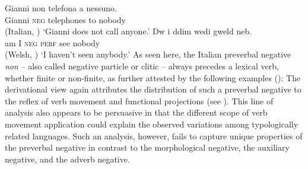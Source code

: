 \documentclass[output=paper
	        ,collection
	        ,collectionchapter
 	        ,biblatex
                ,babelshorthands
                ,newtxmath
                ,draftmode
                ,colorlinks, citecolor=brown
]{langscibook}
\begin{document}
{\begin{exe}
\begin{xlist}
\eal
\ex \label{negation-position-1a}
\gll Gianni non telefona a nessuno.\\
     Gianni \textsc{neg} telephones to nobody\\ \hfill (Italian, \citealt[]{Borsley:06})
\glt`Gianni does not call anyone.'
\ex \label{negation-position-1c}
\gll Dw i ddim wedi gweld neb.\\
     am I \textsc{neg} \textsc{perf} see nobody\\ \hfill  (Welsh, \citealt[]{Borsley:05})
\glt `I haven't seen anybody.'
\zl
%
%
As seen here, 
the Italian preverbal negative \textit{non} -- also called negative particle or
clitic -- always precedes a lexical  verb, whether finite or
non-finite, as further attested by the following
examples (\citealp[Chapter~4]{Kim:00}):
%
\eal
{}
%
%
\zl
%
%
The derivational view again attributes the distribution of such
a preverbal negative to the reflex of verb movement and functional
projections (see \citealt[Chapter~1]{Belletti:90}). This line of analysis also appears to be persuasive
in that the different scope of verb movement application could explain
the observed variations among typologically related
languages. Such an analysis, however,
  fails to capture unique properties of the preverbal negative
  in contrast to the morphological negative, the auxiliary negative, and the adverb negative.


\end{xlist}
\end{exe}}
\end{document}
